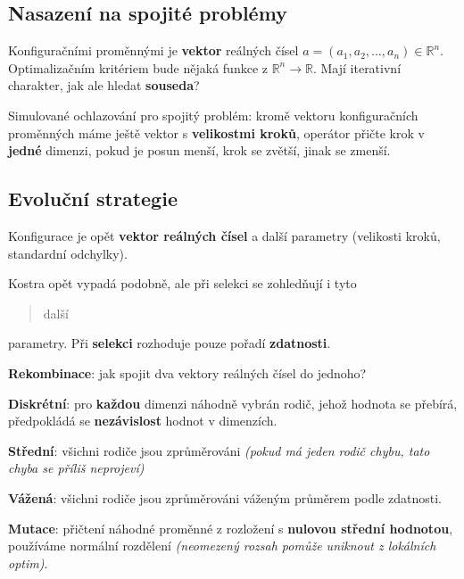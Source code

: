 \subsection{Nasazení na spojité problémy}

Konfiguračními proměnnými je \textbf{vektor} reálných čísel $a = (a_1, a_2, \ldots, a_n) \in \mathbb{R}^n$. Optimalizačním kritériem bude nějaká funkce z $\mathbb{R}^n \to \mathbb{R}$. Mají iterativní charakter, jak ale hledat \textbf{souseda}?

\vspace{4pt}
\noindent Simulované ochlazování pro spojitý problém: kromě vektoru konfiguračních proměnných máme ještě vektor s \textbf{velikostmi kroků}, operátor přičte krok v \textbf{jedné} dimenzi, pokud je posun menší, krok se zvětší, jinak se zmenší.

\subsection{Evoluční strategie}

Konfigurace je opět \textbf{vektor reálných čísel} a další parametry (velikosti kroků, standardní odchylky).

\vspace{4pt}
\noindent Kostra opět vypadá podobně, ale při selekci se zohledňují i tyto \blockquote{další} parametry. Při \textbf{selekci} rozhoduje pouze pořadí \textbf{zdatnosti}.

\vspace{4pt}
\noindent \textbf{Rekombinace}: jak spojit dva vektory reálných čísel do jednoho?

\vspace{4pt}
\noindent \textbf{Diskrétní}: pro \textbf{každou} dimenzi náhodně vybrán rodič, jehož hodnota se přebírá, předpokládá se \textbf{nezávislost} hodnot v dimenzích.

\vspace{2pt}
\noindent \textbf{Střední}: všichni rodiče jsou zprůměrováni \textit{(pokud má jeden rodič chybu, tato chyba se příliš neprojeví)}

\vspace{2pt}
\noindent \textbf{Vážená}: všichni rodiče jsou zprůměrováni váženým průměrem podle zdatnosti.

\vspace{6pt}
\noindent \textbf{Mutace}: přičtení náhodné proměnné z rozložení s \textbf{nulovou střední hodnotou}, používáme normální rozdělení \textit{(neomezený rozsah pomůže uniknout z lokálních optim)}.

